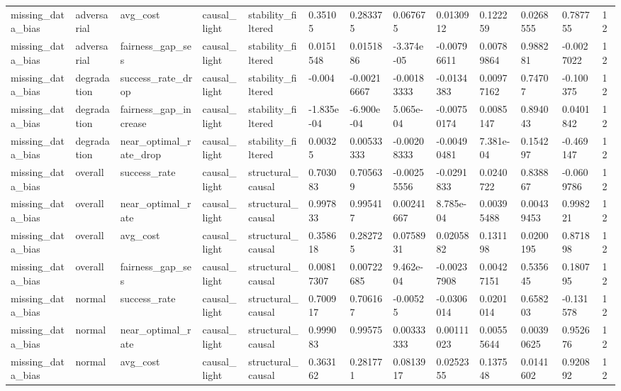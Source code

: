 \begin{tabular}{lllllllllllll}
missing\_data\_bias & adversarial & avg\_cost & causal\_light & stability\_filtered & 0.35105 & 0.283375 & 0.067675 & 0.0130912 & 0.122259 & 0.0268555 & 0.787755 & 12 \\
missing\_data\_bias & adversarial & fairness\_gap\_ses & causal\_light & stability\_filtered & 0.0151548 & 0.0151886 & -3.374e-05 & -0.00796611 & 0.00789864 & 0.988281 & -0.0027022 & 12 \\
missing\_data\_bias & degradation & success\_rate\_drop & causal\_light & stability\_filtered & -0.004 & -0.00216667 & -0.00183333 & -0.0134383 & 0.00977162 & 0.74707 & -0.100375 & 12 \\
missing\_data\_bias & degradation & fairness\_gap\_increase & causal\_light & stability\_filtered & -1.835e-04 & -6.900e-04 & 5.065e-04 & -0.00750174 & 0.0085147 & 0.894043 & 0.0401842 & 12 \\
missing\_data\_bias & degradation & near\_optimal\_rate\_drop & causal\_light & stability\_filtered & 0.00325 & 0.00533333 & -0.00208333 & -0.00490481 & 7.381e-04 & 0.154297 & -0.469147 & 12 \\
missing\_data\_bias & overall & success\_rate & causal\_light & structural\_causal & 0.703083 & 0.705639 & -0.00255556 & -0.0291833 & 0.0240722 & 0.838867 & -0.0609786 & 12 \\
missing\_data\_bias & overall & near\_optimal\_rate & causal\_light & structural\_causal & 0.997833 & 0.995417 & 0.00241667 & 8.785e-04 & 0.00395488 & 0.00439453 & 0.998221 & 12 \\
missing\_data\_bias & overall & avg\_cost & causal\_light & structural\_causal & 0.358618 & 0.282725 & 0.0758931 & 0.0205882 & 0.131198 & 0.0200195 & 0.871898 & 12 \\
missing\_data\_bias & overall & fairness\_gap\_ses & causal\_light & structural\_causal & 0.00817307 & 0.00722685 & 9.462e-04 & -0.00237908 & 0.00427151 & 0.535645 & 0.180795 & 12 \\
missing\_data\_bias & normal & success\_rate & causal\_light & structural\_causal & 0.700917 & 0.706167 & -0.00525 & -0.0306014 & 0.0201014 & 0.658203 & -0.131578 & 12 \\
missing\_data\_bias & normal & near\_optimal\_rate & causal\_light & structural\_causal & 0.999083 & 0.99575 & 0.00333333 & 0.00111023 & 0.00555644 & 0.00390625 & 0.952676 & 12 \\
missing\_data\_bias & normal & avg\_cost & causal\_light & structural\_causal & 0.363162 & 0.281771 & 0.0813917 & 0.0252355 & 0.137548 & 0.0141602 & 0.920892 & 12 \\

\end{tabular}
